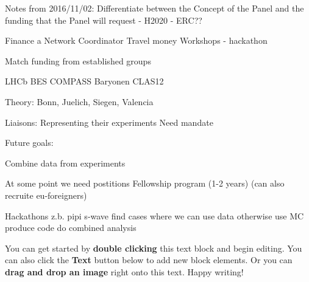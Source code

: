 




Notes from 2016/11/02:
Differentiate between the Concept of the Panel
and
the funding that the Panel will request
- H2020
- ERC??

Finance a Network Coordinator
Travel money
Workshops - hackathon

Match funding from established groups

LHCb
BES
COMPASS
Baryonen CLAS12

Theory: Bonn, Juelich, Siegen, Valencia 



Liaisons:
Representing their experiments
Need mandate


Future goals:

Combine data from experiments

At some point we need postitions
Fellowship program (1-2 years) (can also recruite eu-foreigners)

Hackathons
z.b. pipi s-wave
find cases where we can use data
otherwise use MC
produce code
do combined analysis


You can get started by \textbf{double clicking} this text block and begin editing. You can also click the \textbf{Text} button below to add new block elements. Or you can \textbf{drag and drop an image} right onto this text. Happy writing!
